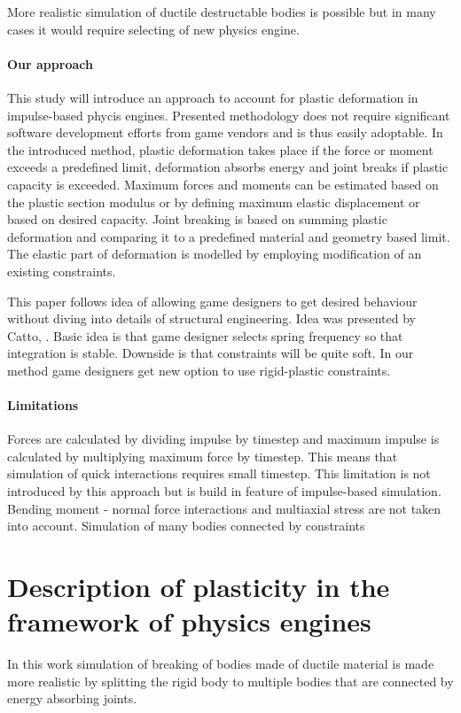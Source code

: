 \documentclass{jcgt}
\begin{document}
More realistic simulation of ductile destructable bodies is possible but in many cases it would require 
selecting of new physics engine.

\paragraph{Our approach}
This study will introduce an approach to account for plastic deformation in impulse-based phycis engines.   
Presented methodology does not require significant software development efforts from
game vendors and is thus easily adoptable. 
In the introduced method, plastic deformation takes place if the force or moment exceeds a predefined 
limit, deformation absorbs energy and joint breaks if plastic capacity is exceeded. 
Maximum forces and moments can be estimated based on the plastic section modulus or
by defining maximum elastic displacement or based on desired capacity.
Joint breaking is based on summing plastic deformation and comparing it to a
predefined material and geometry based limit. The elastic part of deformation is modelled by employing 
modification of an existing constraints. 

This paper follows idea of
allowing game designers to get desired behaviour without diving into details of structural engineering.
Idea was presented by Catto, \cite{ecsc}. Basic idea is that game designer selects spring frequency so that
integration is stable. Downside is that constraints will be quite soft. In our method game designers get new option
to use rigid-plastic constraints.

\paragraph{Limitations}
Forces are calculated by dividing impulse by timestep and maximum impulse is calculated
by multiplying maximum force by timestep. 
This means that simulation of quick interactions requires small timestep.
This limitation is not introduced by this approach but is build in feature of impulse-based simulation.
Bending moment - normal force interactions and multiaxial stress are not taken into account. 
Simulation of many bodies connected by constraints

\section{Description of plasticity in the framework of physics engines}

In this work simulation of breaking of bodies made of ductile material is made more realistic 
by splitting the rigid body
to multiple bodies that are connected by energy absorbing joints.
\end{document}
